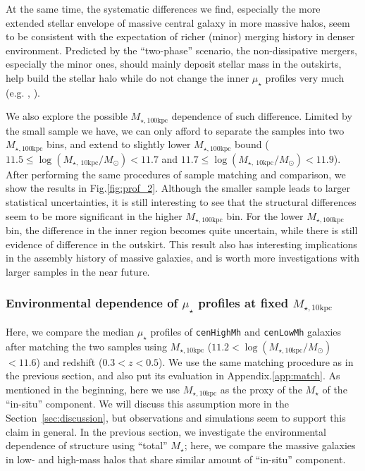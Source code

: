 \documentclass{emulateapj}
\def\rbcg{\texttt{cenHighMh}}
\def\nbcg{\texttt{cenLowMh}}
\def\mstar{{$M_{\star}$}}
\def\minn{{$M_{\star,10\mathrm{kpc}}$}}
\def\mtot{{$M_{\star,100\mathrm{kpc}}$}}
\def\logminn{{$\log (M_{\star,10\mathrm{kpc}}/M_{\odot})$}}
\def\mden{{$\mu_{\star}$}}
\newcommand{\update}[1]{\textcolor{Bittersweet}{#1}}
\begin{document}
\begin{CJK*}{UTF8}{gbsn}
    At the same time, the systematic differences we find, especially the more 
    extended stellar envelope of massive central galaxy in more massive halos, 
    seem to be consistent with the expectation of richer (minor) merging history
    in denser environment. 
    \update{
    Predicted by the ``two-phase'' scenario, the non-dissipative mergers, especially 
    the minor ones, should mainly deposit stellar mass in the outskirts, help 
    build the stellar halo while do not change the inner \mden{} profiles very 
    much (e.g. \citealt{Hilz2013}, \citealt{Oogi2013}).}

    We also explore the possible \mtot{} dependence of such difference.  
    Limited by the small sample we have, we can only afford to separate the 
    samples into two \mtot{} bins, and extend to slightly lower \mtot{} bound 
    ($11.5 \leq \log (M_{\star,\ 10\mathrm{kpc}}/M_{\odot}) < 11.7$ and 
     $11.7 \leq \log (M_{\star,\ 10\mathrm{kpc}}/M_{\odot}) < 11.9$).  
    After performing the same procedures of sample matching and comparison, 
    we show the results in Fig.\ref{fig:prof_2}.   
    Although the smaller sample leads to larger statistical uncertainties, 
    it is still interesting to see that the structural differences seem to 
    be more significant in the higher \mtot{} bin.  
    For the lower \mtot{} bin, the difference in the inner region becomes quite 
    uncertain, while there is still evidence of difference in the outskirt.  
    This result also has interesting implications in the assembly history
    of massive galaxies, and is worth more investigations with larger samples
    in the near future.  


\subsubsection{Environmental dependence of \mden{} profiles at fixed \minn{}}
    \label{sssec:sbp_minn}

    \update{Here, we compare the median \mden{} profiles of \rbcg{} and \nbcg{} galaxies
    after matching the two samples using \minn{} ($11.2 <$\logminn{}$ < 11.6$) and 
    redshift ($0.3 < z < 0.5$).
    We use the same matching procedure as in the previous section, and also put its 
    evaluation in Appendix.\ref{app:match}.
    As mentioned in the beginning, here we use \minn{} as the proxy of the 
    \mstar{} of the ``in-situ'' component. 
    We will discuss this assumption more in the Section~\ref{sec:discussion}, but 
    observations and simulations seem to support this claim in general. 
    In the previous section, we investigate the environmental dependence of structure 
    using ``total'' \mstar{}; here, we compare the massive galaxies in low- and 
    high-mass halos that share similar amount of ``in-situ'' component.}
    

\end{CJK*}
\end{document}

